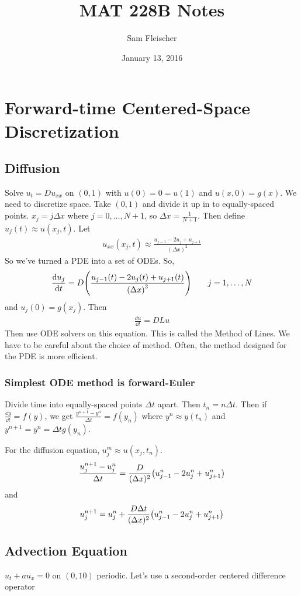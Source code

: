 \documentclass{article}
\title{MAT 228B Notes}
\author{Sam Fleischer}
\date{January 13, 2016}
\newcommand{\dx}{\Delta x}
\newcommand{\dt}{\Delta t}
\begin{document}
    \maketitle

    \section{Forward-time Centered-Space Discretization}

        \subsection{Diffusion}
            Solve $u_t = Du_{xx}$ on $(0,1)$ with $u(0) = 0 = u(1)$ and $u(x,0) = g(x)$.  We need to discretize space.  Take $(0,1)$ and divide it up in to equally-spaced points.  $x_j = j\dx$ where $j = 0,\dots,N+1$, so $\dx = \frac{1}{N+1}$.  Then define $u_j(t) \approx u(x_j,t)$.  Let
            \begin{align*}
                u_{xx}(x_j,t) \approx \frac{u_{j-1} - 2u_j + u_{j+1}}{(\dx)^2}
            \end{align*}
            So we've turned a PDE into a set of ODEs.  So,
            \begin{align*}
                \frac{\dd u_j}{\dd t} = D\qty(\frac{u_{j-1}(t) - 2u_j(t) + u_{j+1}(t)}{\qty(\dx)^2}) \qquad j = 1, \dots, N
            \end{align*}
            and $u_j(0) = g(x_j)$.  Then
            \begin{align*}
                \frac{\dd u}{\dd t} = DLu
            \end{align*}
            Then use ODE solvers on this equation.  This is called the Method of Lines.  We have to be careful about the choice of method.  Often, the method designed for the PDE is more efficient.

            \subsubsection{Simplest ODE method is forward-Euler}

                Divide time into equally-spaced points $\dt$ apart.  Then $t_n = n\dt$.  Then if $\frac{\dd y}{\dd t} = f(y)$, we get $\frac{y^{n+1} - y^n}{\dt} = f(y_n)$ where $y^n \approx y(t_n)$ and $y^{n+1} = y^n = \dt g(y_n)$.

                For the diffusion equation, $u_j^m \approx u(x_j,t_n)$.
                \begin{align}
                    \frac{u_j^{n+1} - u_j^n}{\dt} = \frac{D}{(\dx)^2}\qty(u_{j-1}^n - 2u_j^n + u_{j+1}^n)
                \end{align}
                and
                \begin{align}
                    u_j^{n+1} = u_j^n + \frac{D\dt}{(\dx)^2}\qty(u_{j-1}^n - 2u_j^n + u_{j+1}^n)
                \end{align}

        \subsection{Advection Equation}
            $u_t + au_x = 0$ on $(0,10)$ periodic.  Let's use a second-order centered difference operator
\end{document}
